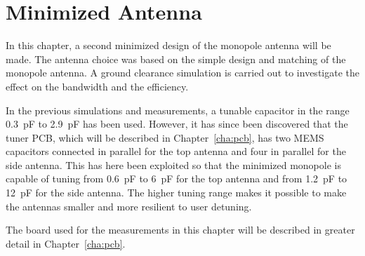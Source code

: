 \chapter{Minimized Antenna}
\label{cha_intro_5mm}
In this chapter, a second minimized design of the monopole antenna will be made.
The antenna choice was based on the simple design and matching of the monopole antenna.
A ground clearance simulation is carried out to investigate the effect on the bandwidth and the efficiency.

In the previous simulations and measurements, a tunable capacitor in the range \SI{0.3}{pF} to \SI{2.9}{pF} has been used. However, it has since been discovered that the tuner PCB, which will be described in Chapter~\ref{cha:pcb}, has two MEMS capacitors connected in parallel for the top antenna and four in parallel for the side antenna. This has here been exploited so that the minimized monopole is capable of tuning from \SI{0.6}{pF} to \SI{6}{pF} for the top antenna and from \SI{1.2}{pF} to \SI{12}{pF} for the side antenna. The higher tuning range makes it possible to make the antennas smaller and more resilient to user detuning.

The board used for the measurements in this chapter will be described in greater detail in Chapter~\ref{cha:pcb}.
